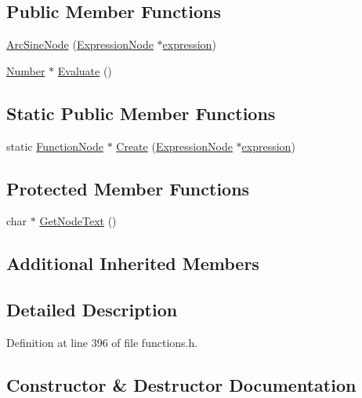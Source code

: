 \subsection*{Public Member Functions}
\begin{DoxyCompactItemize}
\item 
\hyperlink{classArcSineNode_a4aa122cd2144b5b2339f2fea18c17c9b}{Arc\+Sine\+Node} (\hyperlink{classExpressionNode}{Expression\+Node} $\ast$\hyperlink{classFunctionNode_ad7577b179a1937aaf8a0058bb5b546dc}{expression})
\item 
\hyperlink{structNumber}{Number} $\ast$ \hyperlink{classArcSineNode_a30a268b7f74bba579745399ccf3ac009}{Evaluate} ()
\end{DoxyCompactItemize}
\subsection*{Static Public Member Functions}
\begin{DoxyCompactItemize}
\item 
static \hyperlink{classFunctionNode}{Function\+Node} $\ast$ \hyperlink{classArcSineNode_ad4e718a483da426a9d6000e2a8b80951}{Create} (\hyperlink{classExpressionNode}{Expression\+Node} $\ast$\hyperlink{classFunctionNode_ad7577b179a1937aaf8a0058bb5b546dc}{expression})
\end{DoxyCompactItemize}
\subsection*{Protected Member Functions}
\begin{DoxyCompactItemize}
\item 
char $\ast$ \hyperlink{classArcSineNode_a01aee433d9946e37f74bbde5f83dadff}{Get\+Node\+Text} ()
\end{DoxyCompactItemize}
\subsection*{Additional Inherited Members}


\subsection{Detailed Description}


Definition at line 396 of file functions.\+h.



\subsection{Constructor \& Destructor Documentation}
